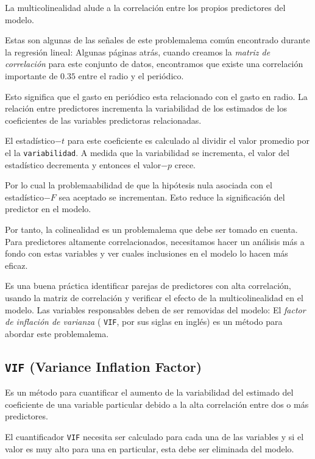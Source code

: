 La multicolinealidad alude a la correlación entre los propios predictores del modelo.


Estas son algunas de las señales de este problemalema común encontrado durante la regresión lineal:  Algunas páginas atrás, cuando creamos la \emph{matriz de correlación} para este conjunto de datos, encontramos que existe una correlación importante de $0.35$ entre el radio y el periódico.

Esto significa que el gasto en periódico esta relacionado con el gasto en radio. La relación entre predictores incrementa la variabilidad de los estimados de los coeficientes de las variables predictoras relacionadas.


El estadístico$-t$ para este coeficiente es calculado al dividir el valor promedio por el la \texttt{variabilidad}.  A medida que la variabilidad se incrementa, el valor del estadístico decrementa y entonces el valor$-p$ crece. 

Por lo cual la problemaabilidad de que la hipótesis nula asociada con el estadístico$-F$ sea aceptado se incrementan. Esto reduce la significación del predictor en el modelo.


Por tanto, la colinealidad es un problemalema que debe ser tomado en cuenta.  Para predictores altamente correlacionados, necesitamos hacer un análisis más a fondo con estas variables y ver cuales inclusiones en el modelo lo hacen más eficaz.


Es una buena práctica identificar parejas de predictores con alta correlación, usando la matriz de correlación y verificar el efecto de la multicolinealidad en el modelo.  Las variables responsables deben de ser removidas del modelo: El \emph{factor de inflación de varianza} ( \texttt{VIF}, por sus siglas en inglés) es un método para abordar este problemalema.

\subsection{\texttt{VIF} (Variance Inflation Factor)}
Es un método para cuantificar el aumento de la variabilidad del estimado del coeficiente de una variable particular debido a la alta correlación entre dos o más predictores.


El cuantificador \texttt{VIF} necesita ser calculado para cada una de las variables y si el valor es muy alto para una en particular, esta debe ser eliminada del modelo.

